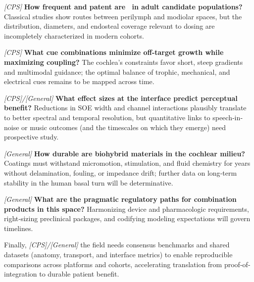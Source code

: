 \textit{[CPS]} \textbf{How frequent and patent are \CPS\ in adult candidate populations?} Classical studies show routes between perilymph and modiolar spaces, but the distribution, diameters, and endosteal coverage relevant to dosing are incompletely characterized in modern cohorts.\cite{raskandersen2006, sando1971, masuda1971} 

\textit{[CPS]} \textbf{What cue combinations minimize off‐target growth while maximizing coupling?} The cochlea’s constraints favor short, steep gradients and multimodal guidance; the optimal balance of trophic, mechanical, and electrical cues remains to be mapped across time.\cite{Kempfle2021, StPeter2022, CarnicerLombarte2024AdvMat}

\textit{[CPS]/[General]} \textbf{What effect sizes at the interface predict perceptual benefit?} Reductions in SOE width and channel interactions plausibly translate to better spectral and temporal resolution, but quantitative links to speech‐in‐noise or music outcomes (and the timescales on which they emerge) need prospective study.\cite{Micco2006, wilson2014}

\textit{[General]} \textbf{How durable are biohybrid materials in the cochlear milieu?} Coatings must withstand micromotion, stimulation, and fluid chemistry for years without delamination, fouling, or impedance drift; further data on long‐term stability in the human basal turn will be determinative.\cite{Dalrymple2020, Horne2023}

\textit{[General]} \textbf{What are the pragmatic regulatory paths for combination products in this space?} Harmonizing device and pharmacologic requirements, right‐sizing preclinical packages, and codifying modeling expectations will govern timelines.\cite{ISO14708, USFDA2021InSilico}

Finally, \textit{[CPS]/[General]} the field needs consensus benchmarks and shared datasets (anatomy, transport, and interface metrics) to enable reproducible comparisons across platforms and cohorts, accelerating translation from proof‐of‐integration to durable patient benefit.\cite{Vecchi2024}

